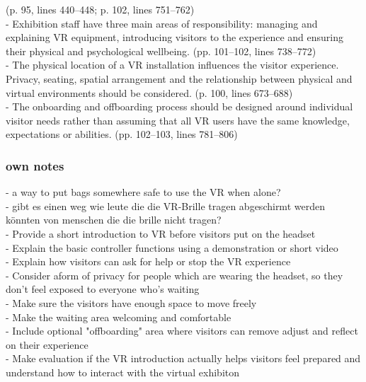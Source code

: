 \documentclass{article}
\begin{document}
(p. 95, lines 440–448; p. 102, lines 751–762)
\\
- Exhibition staff have three main areas of responsibility: managing and explaining VR equipment, introducing visitors to the experience and ensuring their physical and psychological wellbeing.
(pp. 101–102, lines 738–772)
\\
- The physical location of a VR installation influences the visitor experience. Privacy, seating, spatial arrangement and the relationship between physical and virtual environments should be considered.
(p. 100, lines 673–688)
\\
- The onboarding and offboarding process should be designed around individual visitor needs rather than assuming that all VR users have the same knowledge, expectations or abilities.
(pp. 102–103, lines 781–806)
\\

\subsubsection{own notes}
- a way to put bags somewhere safe to use the VR when alone?
\\
- gibt es einen weg wie leute die die VR-Brille tragen abgeschirmt werden könnten von menschen die die brille nicht tragen?
\\
- Provide a short introduction to VR before visitors put on the headset
\\
- Explain the basic controller functions using a demonstration or short video
\\
- Explain how visitors can ask for help or stop the VR experience
\\
- Consider aform of privacy for people which are wearing the headset, so they don't feel exposed to everyone who's waiting
\\
- Make sure the visitors have enough space to move freely
\\
- Make the waiting area welcoming and comfortable
\\
- Include optional "offboarding" area where visitors can remove adjust and reflect on their experience
\\
- Make evaluation if the VR introduction actually helps visitors feel prepared and understand how to interact with the virtual exhibiton
\\
\end{document}

